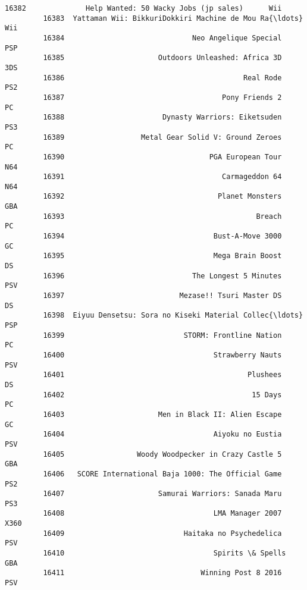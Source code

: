\documentclass[11pt]{article}
\begin{document}
\begin{Verbatim}[commandchars=\\\{\}]
         16382              Help Wanted: 50 Wacky Jobs (jp sales)      Wii   
         16383  Yattaman Wii: BikkuriDokkiri Machine de Mou Ra{\ldots}      Wii   
         16384                              Neo Angelique Special      PSP   
         16385                      Outdoors Unleashed: Africa 3D      3DS   
         16386                                          Real Rode      PS2   
         16387                                     Pony Friends 2       PC   
         16388                       Dynasty Warriors: Eiketsuden      PS3   
         16389                  Metal Gear Solid V: Ground Zeroes       PC   
         16390                                  PGA European Tour      N64   
         16391                                     Carmageddon 64      N64   
         16392                                    Planet Monsters      GBA   
         16393                                             Breach       PC   
         16394                                   Bust-A-Move 3000       GC   
         16395                                   Mega Brain Boost       DS   
         16396                              The Longest 5 Minutes      PSV   
         16397                           Mezase!! Tsuri Master DS       DS   
         16398  Eiyuu Densetsu: Sora no Kiseki Material Collec{\ldots}      PSP   
         16399                            STORM: Frontline Nation       PC   
         16400                                   Strawberry Nauts      PSV   
         16401                                           Plushees       DS   
         16402                                            15 Days       PC   
         16403                      Men in Black II: Alien Escape       GC   
         16404                                   Aiyoku no Eustia      PSV   
         16405                 Woody Woodpecker in Crazy Castle 5      GBA   
         16406   SCORE International Baja 1000: The Official Game      PS2   
         16407                      Samurai Warriors: Sanada Maru      PS3   
         16408                                   LMA Manager 2007     X360   
         16409                            Haitaka no Psychedelica      PSV   
         16410                                   Spirits \& Spells      GBA   
         16411                                Winning Post 8 2016      PSV   
         

\end{Verbatim}
\end{document}
